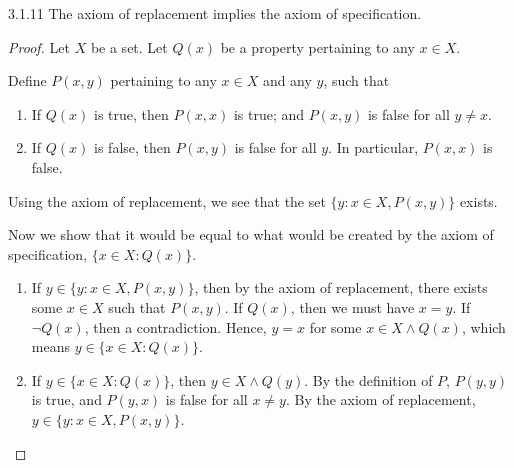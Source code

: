 \begin{exercise}{3.1.11}
	The axiom of replacement implies the axiom of specification.
\end{exercise}
\begin{proof}
	Let $X$ be a set. Let $Q(x)$ be a property pertaining to any $x \in X$.
	
	Define $P(x,y)$ pertaining to any $x \in X$ and any $y$, such that
	\begin{enumerate}
		\item If $Q(x)$ is true, then $P(x,x)$ is true; and $P(x,y)$ is false for all $y \ne x$.
		\item If $Q(x)$ is false, then $P(x,y)$ is false for all $y$. In particular, $P(x,x)$ is false.
	\end{enumerate}

	Using the axiom of replacement, we see that the set $\{y: x \in X, P(x,y)\}$ exists.

	Now we show that it would be equal to what would be created by the axiom of specification, $\{x \in X: Q(x)\}$.
	\begin{enumerate}
		\item If $y \in \{y: x \in X, P(x,y)\}$, then by the axiom of replacement, there exists some $x \in X$ such that $P(x,y)$. If $Q(x)$, then we must have $x = y$. If $\neg Q(x)$, then a contradiction. Hence, $y = x$ for some $x \in X \wedge Q(x)$, which means $y \in \{x \in X: Q(x)\}$.
		
		\item If $y \in \{x \in X: Q(x)\}$, then $y \in X \wedge Q(y)$. By the definition of $P$, $P(y,y)$ is true, and $P(y,x)$ is false for all $x \ne y$. By the axiom of replacement, $y \in \{y: x \in X, P(x,y)\}$.
	\end{enumerate}
\end{proof}

